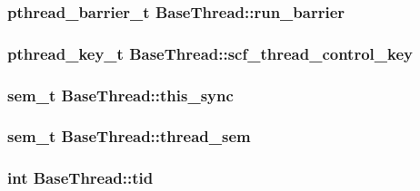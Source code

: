 \hypertarget{class_base_thread_a4543f6212d6987b4fd9460cf3c5a7991}{
\subsubsection[{run\-\_\-barrier}]{\setlength{\rightskip}{0pt plus 5cm}pthread\-\_\-barrier\-\_\-t Base\-Thread\-::run\-\_\-barrier\hspace{0.3cm}{\ttfamily [static]}}}\label{class_base_thread_a4543f6212d6987b4fd9460cf3c5a7991}
\hypertarget{class_base_thread_a2241451e1817682a1a1e14cf95c934d0}{
\subsubsection[{scf\-\_\-thread\-\_\-control\-\_\-key}]{\setlength{\rightskip}{0pt plus 5cm}pthread\-\_\-key\-\_\-t Base\-Thread\-::scf\-\_\-thread\-\_\-control\-\_\-key\hspace{0.3cm}{\ttfamily [static]}}}\label{class_base_thread_a2241451e1817682a1a1e14cf95c934d0}
\hypertarget{class_base_thread_accfa214a7f01edea97f022f60ac58ba9}{
\subsubsection[{this\-\_\-sync}]{\setlength{\rightskip}{0pt plus 5cm}sem\-\_\-t Base\-Thread\-::this\-\_\-sync}}\label{class_base_thread_accfa214a7f01edea97f022f60ac58ba9}
\hypertarget{class_base_thread_a05fa5117e2975d76a5c215e0cec0ff32}{
\subsubsection[{thread\-\_\-sem}]{\setlength{\rightskip}{0pt plus 5cm}sem\-\_\-t Base\-Thread\-::thread\-\_\-sem\hspace{0.3cm}{\ttfamily [static]}}}\label{class_base_thread_a05fa5117e2975d76a5c215e0cec0ff32}
\hypertarget{class_base_thread_a98cb2fa092cfd40fcdc3992096e58db8}{
\subsubsection[{tid}]{\setlength{\rightskip}{0pt plus 5cm}int Base\-Thread\-::tid}}\label{class_base_thread_a98cb2fa092cfd40fcdc3992096e58db8}


